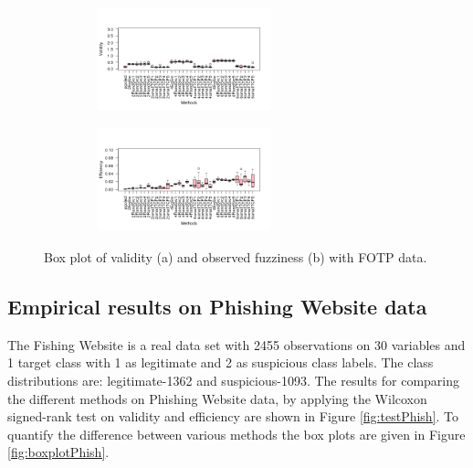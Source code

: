 \documentclass[main]{subfiles}
\begin{document}
\begin{figure}[h]
\centering
\begin{subfigure}{.5\textwidth}
  \centering
  \includegraphics[width=6cm,height=3cm]{images/boxplotFOTP}
\end{subfigure}%
\begin{subfigure}{.5\textwidth}
  \centering
  \includegraphics[width=6cm,height=3cm]{images/boxplotFOTP_eff}
\end{subfigure}%
\caption{Box plot of validity (a) and observed fuzziness (b) with FOTP data.} \label{fig:boxplotFotp}
\end{figure}

\subsection{Empirical results on Phishing Website data}
The Fishing Website is a real data set with 2455 observations  on 30 variables and 1 target class with 1 as legitimate and 2 as suspicious class labels.  The class distributions are: legitimate-1362 and suspicious-1093. The results for comparing the different methods on Phishing Website data, by applying the Wilcoxon signed-rank test on validity and efficiency are shown in Figure \ref{fig:testPhish}. To quantify the difference between various methods the box plots are given in Figure \ref{fig:boxplotPhish}.
\end{document}
